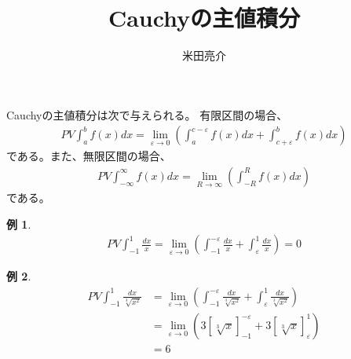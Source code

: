 \documentclass{jsarticle}
\newtheorem{eg}{例}
\begin{document}
\title{Cauchyの主値積分}
\author{米田亮介}
\maketitle	

Cauchyの主値積分は次で与えられる。
有限区間の場合、
\begin{align}
PV\int_{a}^{b}f(x)dx=\lim_{\varepsilon\to 0}\left(
\int_{a}^{c-\varepsilon}f(x)dx+\int_{c+\varepsilon}^{b}f(x)dx
\right)
\end{align}
である。また、無限区間の場合、
\begin{align}
PV\int_{-\infty}^{\infty}f(x)dx=\lim_{R\to\infty}\left(
\int_{-R}^{R}f(x)dx
\right)
\end{align}
である。

\begin{eg}
\begin{align}
PV\int_{-1}^{1}\frac{dx}{x}=\lim_{\varepsilon\to0}\left(
\int_{-1}^{-\varepsilon}\frac{dx}{x}+\int_{\varepsilon}^{1}\frac{dx}{x}
\right)=0
\end{align}
\end{eg}

\begin{eg}
\begin{align}
PV\int_{-1}^{1}\frac{dx}{\sqrt[3]{x^2}}&=\lim_{\varepsilon\to0}\left(
\int_{-1}^{-\varepsilon}\frac{dx}{\sqrt[3]{x^2}}+\int_{\varepsilon}^{1}\frac{dx}{\sqrt[3]{x^2}}
\right)\\
&=\lim_{\varepsilon\to0}\left(
3\left[\sqrt[3]{x}\right]_{-1}^{-\varepsilon}
+3\left[\sqrt[3]{x}\right]_{\varepsilon}^{1}\right)\\
&=6
\end{align}
\end{eg}
\end{document}
